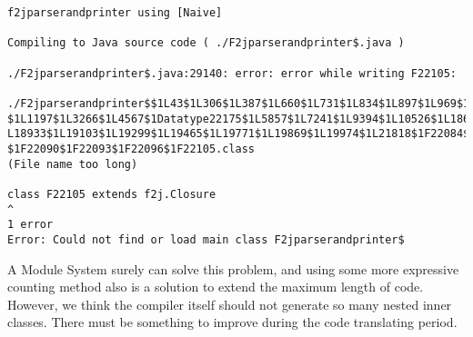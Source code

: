 \begin{itemize}
\begin{lstlisting}
f2jparserandprinter using [Naive]

Compiling to Java source code ( ./F2jparserandprinter$.java )

./F2jparserandprinter$.java:29140: error: error while writing F22105:

./F2jparserandprinter$$1L43$1L306$1L387$1L660$1L731$1L834$1L897$1L969$1L1050
$1L1197$1L3266$1L4567$1Datatype22175$1L5857$1L7241$1L9394$1L10526$1L18657$1
L18933$1L19103$1L19299$1L19465$1L19771$1L19869$1L19974$1L21818$1F22084$1F22087
$1F22090$1F22093$1F22096$1F22105.class
(File name too long)

class F22105 extends f2j.Closure
^
1 error
Error: Could not find or load main class F2jparserandprinter$
\end{lstlisting} 

A Module System surely can solve this problem, and using some more expressive counting method also is a solution to extend the maximum length of code. However, we think the compiler itself should not generate so many nested inner classes. There must be something to improve during the code translating period.

\end{itemize}